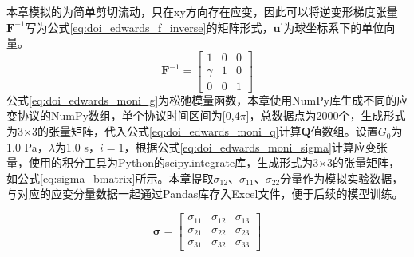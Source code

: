 本章模拟的为简单剪切流动，只在xy方向存在应变，因此可以将逆变形梯度张量$\mathbf{F}^{-1}$写为公式\eqref{eq:doi_edwards_f_inverse}的矩阵形式，$\mathbf{u}^{\prime}$为球坐标系下的单位向量。
\begin{equation}
  \mathbf{F}^{-1} = \begin{bmatrix}
    1      & 0 & 0 \\
    \gamma & 1 & 0 \\
    0      & 0 & 1
  \end{bmatrix} \label{eq:doi_edwards_f_inverse}
\end{equation}
公式\eqref{eq:doi_edwards_moni_g}为松弛模量函数，本章使用NumPy库生成不同的应变协议的NumPy数组，单个协议时间区间为[0,4$\pi$]，总数据点为2000个，生成形式为3$\times$3的张量矩阵，代入公式\eqref{eq:doi_edwards_moni_q}计算$\mathbf{Q}$值数组。设置$G_0$为1.0 Pa，$\lambda$为1.0 s，$i=1$，根据公式\eqref{eq:doi_edwards_moni_sigma}计算应变张量，使用的积分工具为Python的scipy.integrate库，生成形式为3$\times$3的张量矩阵，如公式\eqref{eq:sigma_bmatrix}所示。本章提取$
  \sigma_{12}$、$\sigma_{11}$、$\sigma_{22}$分量作为模拟实验数据，与对应的应变分量数据一起通过Pandas库存入Excel文件，便于后续的模型训练。


\begin{equation}
  \boldsymbol{\sigma} = \begin{bmatrix}
    \sigma_{11} & \sigma_{12} & \sigma_{13} \\
    \sigma_{21} & \sigma_{22} & \sigma_{23} \\
    \sigma_{31} & \sigma_{32} & \sigma_{33}
  \end{bmatrix} \label{eq:sigma_bmatrix}
\end{equation}


